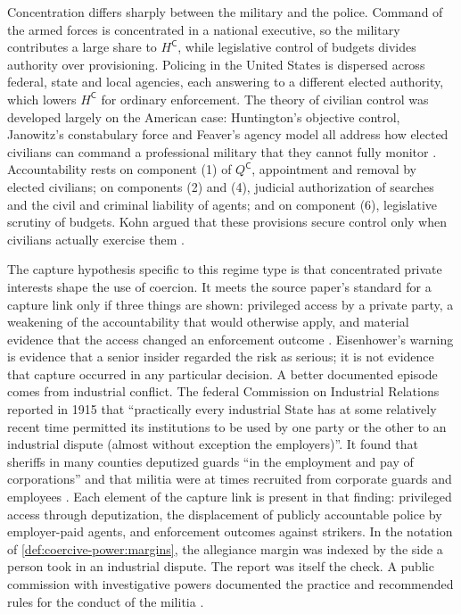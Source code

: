 \documentclass[11pt,letterpaper]{article}
\theoremstyle{definition}
\theoremstyle{remark}
\newcommand{\pC}{\mathsf{C}}
\begin{document}
Concentration differs sharply between the military and the police. Command of the armed forces is concentrated in a national executive, so the military contributes a large share to $H^{\pC}$, while legislative control of budgets divides authority over provisioning. Policing in the United States is dispersed across federal, state and local agencies, each answering to a different elected authority, which lowers $H^{\pC}$ for ordinary enforcement. The theory of civilian control was developed largely on the American case: Huntington's objective control, Janowitz's constabulary force and Feaver's agency model all address how elected civilians can command a professional military that they cannot fully monitor \citep{huntington1957,janowitz1960,feaver2003}. Accountability rests on component (1) of $Q^{\pC}$, appointment and removal by elected civilians; on components (2) and (4), judicial authorization of searches and the civil and criminal liability of agents; and on component (6), legislative scrutiny of budgets. Kohn argued that these provisions secure control only when civilians actually exercise them \citep{kohn1997}.

The capture hypothesis specific to this regime type is that concentrated private interests shape the use of coercion. It meets the source paper's standard for a capture link only if three things are shown: privileged access by a private party, a weakening of the accountability that would otherwise apply, and material evidence that the access changed an enforcement outcome \citep{largo2026hbs}. Eisenhower's warning is evidence that a senior insider regarded the risk as serious; it is not evidence that capture occurred in any particular decision. A better documented episode comes from industrial conflict. The federal Commission on Industrial Relations reported in 1915 that ``practically every industrial State has at some relatively recent time permitted its institutions to be used by one party or the other to an industrial dispute (almost without exception the employers)''. It found that sheriffs in many counties deputized guards ``in the employment and pay of corporations'' and that militia were at times recruited from corporate guards and employees \citep[pp.~147 to 148]{cir1915}. Each element of the capture link is present in that finding: privileged access through deputization, the displacement of publicly accountable police by employer-paid agents, and enforcement outcomes against strikers. In the notation of \cref{def:coercive-power:margins}, the allegiance margin was indexed by the side a person took in an industrial dispute. The report was itself the check. A public commission with investigative powers documented the practice and recommended rules for the conduct of the militia \citep{cir1915}.
\end{document}
